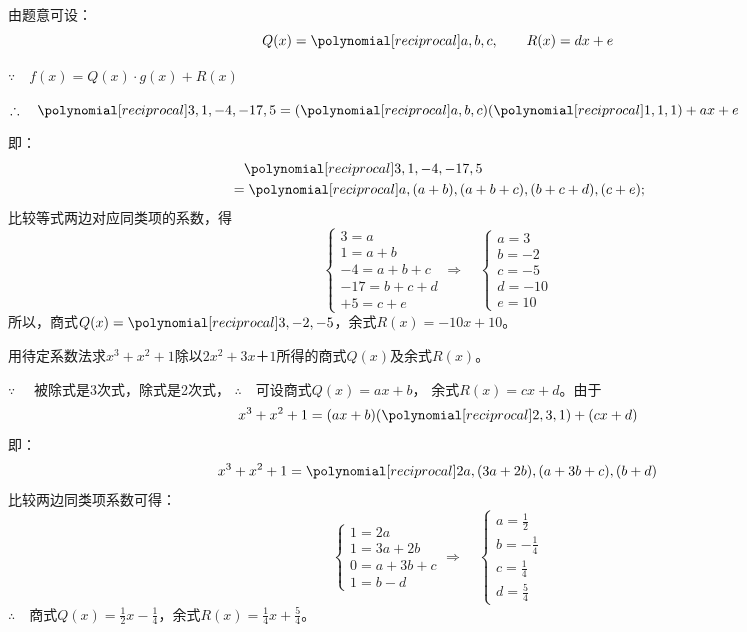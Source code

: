 \begin{solution}
    由题意可设：
\[Q(x)=\poly{a,b,c},\qquad R(x)=dx+e\]

$\because\quad f(x)=Q(x)\cdot g(x)+R(x)$   

$\therefore\quad \poly{3,1,-4,-17,5}=(\poly{a,b,c})(\poly{1,1,1})+ax+e$

即：
\[\begin{split}
    &\quad \poly{3,1,-4,-17,5}\\
    &=\poly{a,(a+b),(a+b+c),(b+c+d),(c+e)};
\end{split}\] 
比较等式两边对应同类项的系数，得
\[\begin{cases}
    3=a\\
    1=a+b\\
    -4=a+b+c\\
    -17=b+c+d\\
    +5=c+e
\end{cases}\Rightarrow\quad  \begin{cases}
    a=3\\
    b=-2\\
    c=-5\\
    d=-10\\
    e=10
\end{cases}\]
所以，商式$Q(x)=\poly{3,-2,-5}$，余式$R(x)=-10x+10$。
\end{solution}

\begin{example}
    用待定系数法求$x^3+x^2+1$除以$2x^2+3x＋1$所得的商式$Q(x)$及余式$R(x)$。
\end{example}

\begin{solution}
$\because\quad $ 被除式是3次式，除式是2次式，
$\therefore\quad $可设商式$Q(x)=ax+b$，
余式$R(x)=cx+d$。由于
\[x^3+x^2+1=(ax+b)(\poly{2,3,1})+(cx+d)\]
即：
\[x^3+x^2+1=\poly{2a, (3a+2b), (a+3b+c), (b+d)}\]
比较两边同类项系数可得：
\[\begin{cases}
  1=2a\\
  1=3a+2b\\
  0=a+3b+c\\
  1=b-d  
\end{cases}\Rightarrow\quad \begin{cases}
    a=\frac{1}{2}\\
    b=-\frac{1}{4}\\
    c=\frac{1}{4}\\
    d=\frac{5}{4}
\end{cases}\]
$\therefore\quad $商式$Q(x)=\frac{1}{2}x-\frac{1}{4}$，余式$R(x)=\frac{1}{4}x+\frac{5}{4}$。
\end{solution}

